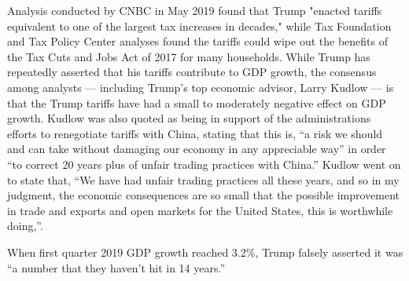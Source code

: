 Analysis conducted by CNBC in May 2019 found that Trump "enacted tariffs
equivalent to one of the largest tax increases in decades," while Tax
Foundation and Tax Policy Center analyses found the tariffs could wipe
out the benefits of the Tax Cuts and Jobs Act of 2017 for many
households. While Trump has repeatedly asserted that his tariffs
contribute to GDP growth, the consensus among analysts --- including
Trump's top economic advisor, Larry Kudlow --- is that the Trump tariffs
have had a small to moderately negative effect on GDP growth. Kudlow was
also quoted as being in support of the administrations efforts to
renegotiate tariffs with China, stating that this is, ``a risk we should
and can take without damaging our economy in any appreciable way'' in
order ``to correct 20 years plus of unfair trading practices with
China.'' Kudlow went on to state that, ``We have had unfair trading
practices all these years, and so in my judgment, the economic
consequences are so small that the possible improvement in trade and
exports and open markets for the United States, this is worthwhile
doing,''.

When first quarter 2019 GDP growth reached 3.2\%, Trump falsely asserted
it was ``a number that they haven't hit in 14 years.''

